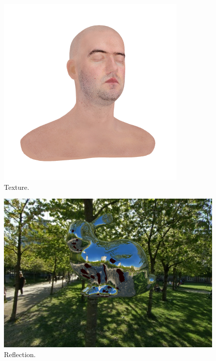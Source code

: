 {\begin{figure}
\centering
\includegraphics[width=\linewidth]{fig/texture.png}
\caption{Texture.}
\label{fig:texture}
\end{figure}
\begin{figure}
		\centering
		\includegraphics[width=\linewidth]{fig/reflection.png}
		\caption{Reflection.}
		\label{fig:reflection}
\end{figure}
	
}
